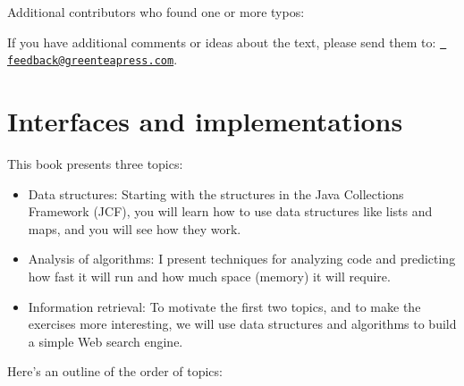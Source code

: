\documentclass[12pt]{book}
\theoremstyle{exercise}
\begin{document}
Additional contributors who found one or more typos: 

If you have additional comments or ideas about the text, please send
them to: \href{mailto:feedback@greenteapress.com}{\tt
  feedback@greenteapress.com}.


\mainmatter

\chapter{Interfaces and implementations}
\label{cs-lists-programming-to-an-interface-readme}

This book presents three topics:

\begin{itemize}

\item Data structures: Starting with the structures in the Java
Collections Framework (JCF), you will learn how to use data structures
like lists and maps, and you will see how they work.

\item Analysis of algorithms: I present techniques for analyzing
code and predicting how fast it will run and how much space (memory) it
will require.

\item Information retrieval: To motivate the first two topics, and to
make the exercises more interesting, we will use data structures and
algorithms to build a simple Web search engine.

\end{itemize}

Here's an outline of the order of topics:
\end{document}
